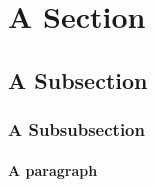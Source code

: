 \documentclass{article}
\begin{document}
\tableofcontents

\section{A Section}
\subsection{A Subsection}
\subsubsection{A Subsubsection}
\paragraph{A paragraph}
\end{document}
